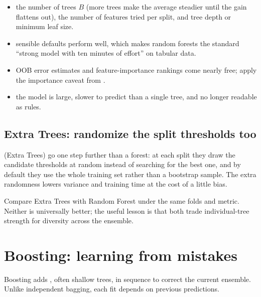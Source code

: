 \begin{itemize}
  \item {} the number of trees $B$ (more trees make the average steadier until the gain flattens out), the number of features tried per split, and tree depth or minimum leaf size.
  \item {} sensible defaults perform well, which makes random forests the standard ``strong model with ten minutes of effort'' on tabular data.
  \item {} OOB error estimates and feature-importance rankings come nearly free; apply the importance caveat from .
  \item {} the model is large, slower to predict than a single tree, and no longer readable as rules.
\end{itemize}

\subsection{Extra Trees: randomize the split thresholds too}
\label{sec:extra-trees}

 (Extra Trees) go one step further than a forest: at each split they draw the candidate thresholds at random instead of searching for the best one, and by default they use the whole training set rather than a bootstrap sample. The extra randomness lowers variance and training time at the cost of a little bias.

Compare Extra Trees with Random Forest under the same folds and metric. Neither is universally better; the useful lesson is that both trade individual-tree strength for diversity across the ensemble.

\section{Boosting: learning from mistakes}

Boosting adds , often shallow trees, in sequence to correct the current ensemble. Unlike independent bagging, each fit depends on previous predictions.

